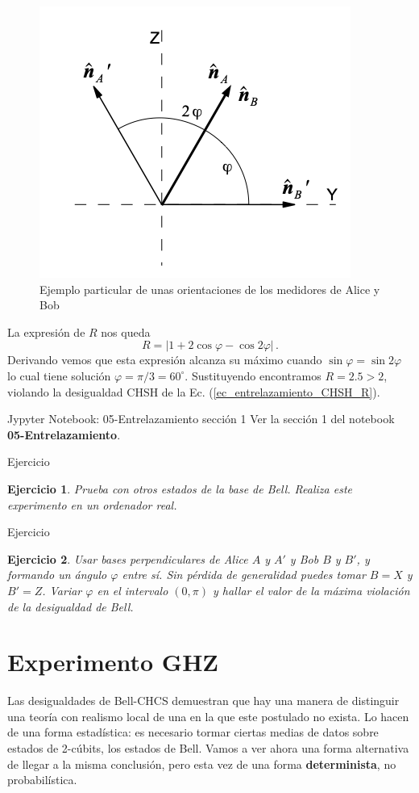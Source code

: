 \documentclass[a4paper,11pt]{book} %
\newtheorem{ejercicio_contador}{Ejercicio}
\newcommand{\Ejercicio}[1]{
		\begin{mybox_gray}{Ejercicio} 
			\begin{ejercicio_contador}
				 #1 
			\end{ejercicio_contador} 
		\end{mybox_gray}
	}
\numberwithin{equation}{chapter}
\begin{document}
	\begin{figure}[t]
	\centering 
	\includegraphics[width=0.35\linewidth]{Figuras/Fig_entrelazamiento_CHSH_basis}
	\caption{Ejemplo particular de unas orientaciones de los medidores de Alice y Bob}
	\label{Fig_entrelazamiento_CHSH_basis}
	\end{figure}

La expresión de $R$ nos queda
$$
R = |1 +  2 \cos\varphi  - \cos 2\varphi|\, .
$$
Derivando vemos que esta expresión alcanza su máximo cuando $\sin\varphi = \sin 2\varphi$ lo cual tiene solución $\varphi = \pi/3 = 60^\circ$. Sustituyendo encontramos $R= 2.5>2$, violando la desigualdad CHSH de la Ec. (\ref{ec_entrelazamiento_CHSH_R}).

	\begin{mybox_orange}{Jypyter Notebook: 05-Entrelazamiento sección 1}
	Ver la sección 1 del notebook \textbf{05-Entrelazamiento}.
	\end{mybox_orange}
	
	\Ejercicio{Prueba con otros estados de la base de Bell. Realiza este experimento en un ordenador real.}
	
	\Ejercicio{Usar bases perpendiculares de  Alice $A$ y $A'$  y Bob $B$ y $B'$, y formando un ángulo $\varphi$ entre sí. Sin pérdida de generalidad puedes tomar $B = X$ y $B' = Z$. Variar $\varphi$ en el intervalo $(0,\pi)$ y hallar el valor de la máxima violación de la desigualdad de Bell.}

    \section{Experimento GHZ}

Las desigualdades de Bell-CHCS demuestran que hay una manera de distinguir una teoría con  realismo local de una en la que este postulado no  exista. Lo hacen de una forma estadística: es necesario tormar ciertas medias de datos sobre estados de 2-cúbits, los  estados de Bell. Vamos a ver ahora una forma alternativa de llegar a la misma conclusión, pero esta vez de una forma \textbf{determinista}, no probabilística.
\end{document}
